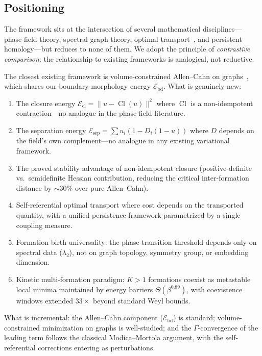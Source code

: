 \documentclass[lettersize,journal]{IEEEtran}
\DeclareMathOperator{\Cl}{Cl}
\begin{document}
\subsection{Positioning}

The framework sits at the intersection of several mathematical disciplines---phase-field theory, spectral graph theory, optimal transport~\cite{Peyre2019}, and persistent homology---but reduces to none of them. We adopt the principle of \emph{contrastive comparison}: the relationship to existing frameworks is analogical, not reductive.

The closest existing framework is volume-constrained Allen--Cahn on graphs~\cite{vanGennip2012}, which shares our boundary-morphology energy $\mathcal{E}_{\mathrm{bd}}$. What is genuinely new:

\begin{enumerate}
\item The closure energy $\mathcal{E}_{\mathrm{cl}} = \|u - \Cl(u)\|^2$ where $\Cl$ is a non-idempotent contraction---no analogue in the phase-field literature.
\item The separation energy $\mathcal{E}_{\mathrm{sep}} = \sum u_i(1 - D_i(1-u))$ where $D$ depends on the field's own complement---no analogue in any existing variational framework.
\item The proved stability advantage of non-idempotent closure (positive-definite vs.\ semidefinite Hessian contribution, reducing the critical inter-formation distance by ${\sim}30\%$ over pure Allen--Cahn).
\item Self-referential optimal transport where cost depends on the transported quantity, with a unified persistence framework parametrized by a single coupling measure.
\item Formation birth universality: the phase transition threshold depends only on spectral data ($\lambda_2$), not on graph topology, symmetry group, or embedding dimension.
\item Kinetic multi-formation paradigm: $K > 1$ formations coexist as metastable local minima maintained by energy barriers $\Theta(\beta^{0.89})$, with coexistence windows extended $33\times$ beyond standard Weyl bounds.
\end{enumerate}

What is incremental: the Allen--Cahn component ($\mathcal{E}_{\mathrm{bd}}$) is standard; volume-constrained minimization on graphs is well-studied; and the $\Gamma$-convergence of the leading term follows the classical Modica--Mortola argument, with the self-referential corrections entering as perturbations.
\end{document}
